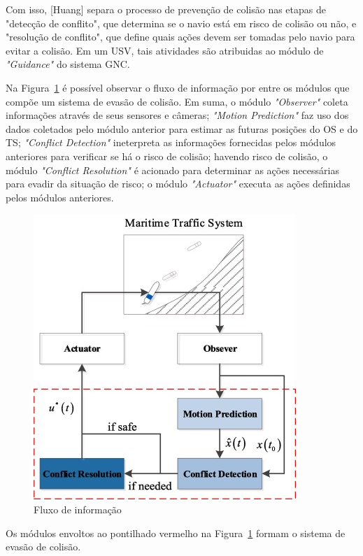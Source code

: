         Com isso, [Huang] separa o processo de prevenção de colisão nas etapas de "detecção de conflito", que determina se o navio está em risco de colisão ou não, e "resolução de conflito", que define quais ações devem ser tomadas pelo navio para evitar a colisão. Em um USV, tais atividades são atribuidas ao módulo de \textit{"Guidance"} do sistema GNC.~\cite{HUANG2020451}
        
        Na Figura~\ref{fig:col_avoid_info_flow} é possível observar o fluxo de informação por entre os módulos que compõe um sistema de evasão de colisão. Em suma, o módulo \textit{"Observer"} coleta informações através de seus sensores e câmeras; \textit{"Motion Prediction"} faz uso dos dados coletados pelo módulo anterior para estimar as futuras posições do OS e do TS; \textit{"Conflict Detection"} ineterpreta as informações fornecidas pelos módulos anteriores para verificar se há o risco de colisão; havendo risco de colisão, o módulo \textit{"Conflict Resolution"} é acionado para determinar as ações necessárias para evadir da situação de risco; o módulo \textit{"Actuator"} executa as ações definidas pelos módulos anteriores.~\cite{HUANG2020451}
        
        \begin{figure}
            \centering
            \includegraphics{fig/information_flow.png}
            \caption{Fluxo de informação ~\cite{HUANG2020451}}
            \label{fig:col_avoid_info_flow}
        \end{figure}
        
        Os módulos envoltos ao pontilhado vermelho na Figura~\ref{fig:col_avoid_info_flow} formam o sistema de evasão de colisão. 
        
    \subsection{}